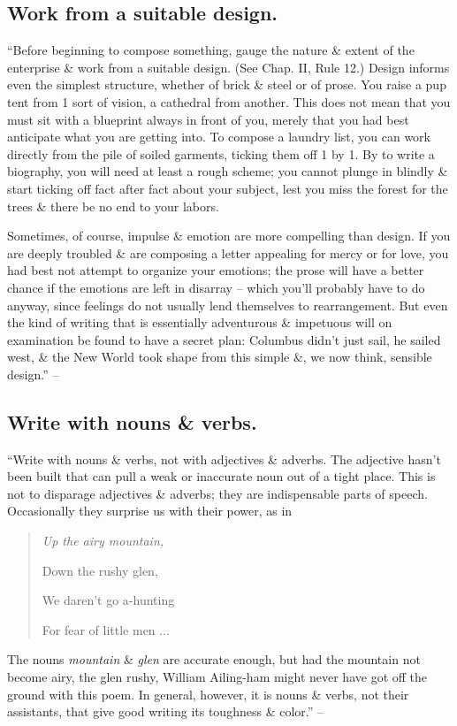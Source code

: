 \documentclass{article}
\numberwithin{equation}{section}
\begin{document}

\subsection{Work from a suitable design.}
``Before beginning to compose something, gauge the nature \& extent of the enterprise \& work from a suitable design. (See Chap. II, Rule 12.) Design informs even the simplest structure, whether of brick \& steel or of prose. You raise a pup tent from 1 sort of vision, a cathedral from another. This does not mean that you must sit with a blueprint always in front of you, merely that you had best anticipate what you are getting into. To compose a laundry list, you can work directly from the pile of soiled garments, ticking them off 1 by 1. By to write a biography, you will need at least a rough scheme; you cannot plunge in blindly \& start ticking off fact after fact about your subject, lest you miss the forest for the trees \& there be no end to your labors.

Sometimes, of course, impulse \& emotion are more compelling than design. If you are deeply troubled \& are composing a letter appealing for mercy or for love, you had best not attempt to organize your emotions; the prose will have a better chance if the emotions are left in disarray -- which you'll probably have to do anyway, since feelings do not usually lend themselves to rearrangement. But even the kind of writing that is essentially adventurous \& impetuous will on examination be found to have a secret plan: Columbus didn't just sail, he sailed west, \& the New World took shape from this simple \&, we now think, sensible design.'' -- \cite[p. 80]{Strunk_White2019}


\subsection{Write with nouns \& verbs.}
``Write with nouns \& verbs, not with adjectives \& adverbs. The adjective hasn't been built that can pull a weak or inaccurate noun out of a tight place. This is not to disparage adjectives \& adverbs; they are indispensable parts of speech. Occasionally they surprise us with their power, as in
\begin{quotation}\it
	Up the airy mountain,
	
	Down the rushy glen,
	
	We daren't go a-hunting
	
	For fear of little men $\ldots$
\end{quotation}
The nouns \textit{mountain} \& \textit{glen} are accurate enough, but had the mountain not become airy, the glen rushy, William Ailing-ham might never have got off the ground with this poem. In general, however, it is nouns \& verbs, not their assistants, that give good writing its toughness \& color.'' -- \cite[p. 81]{Strunk_White2019}
\end{document}
